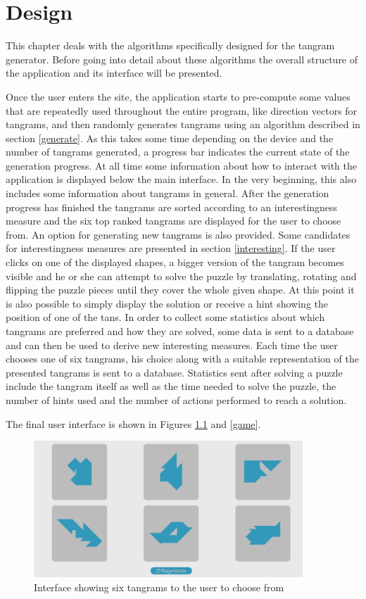 \chapter{Design}\label{chapter:design}
This chapter deals with the algorithms specifically designed for the tangram generator. Before going into detail about these algorithms the overall structure of the application and its interface will be presented. 

Once the user enters the site, the application starts to pre-compute some values that are repeatedly used throughout the entire program, like direction vectors for tangrams, and then randomly generates tangrams using an algorithm described in section \ref{generate}. As this takes some time depending on the device and the number of tangrams generated, a progress bar indicates the current state of the generation progress. At all time some information about how to interact with the application is displayed below the main interface. In the very beginning, this also includes some information about tangrams in general. After the generation progress has finished the tangrams are sorted according to an interestingness measure and the six top ranked tangrams are displayed for the user to choose from. An option for generating new tangrams is also provided. Some candidates for interestingness measures are presented in section \ref{interesting}. If the user clicks on one of the displayed shapes, a bigger version of the tangram becomes visible and he or she can attempt to solve the puzzle by translating, rotating and flipping the puzzle pieces until they cover the whole given shape. At this point it is also possible to simply display the solution or receive a hint showing the position of one of the tans. 
In order to collect some statistics about which tangrams are preferred and how they are solved, some data is sent to a database and can then be used to derive new interesting measures. Each time the user chooses one of six tangrams, his choice along with a suitable representation of the presented tangrams is sent to a database. Statistics sent after solving a puzzle include the tangram itself as well as the time needed to solve the puzzle, the number of hints used and the number of actions performed to reach a solution.

The final user interface is shown in Figures \ref{choose} and \ref{game}.

\begin{figure}
\centering
    \includegraphics[width=0.9\textwidth]{figures/chose.png}
\caption{Interface showing six tangrams to the user to choose from}
\label{choose}
\end{figure}

